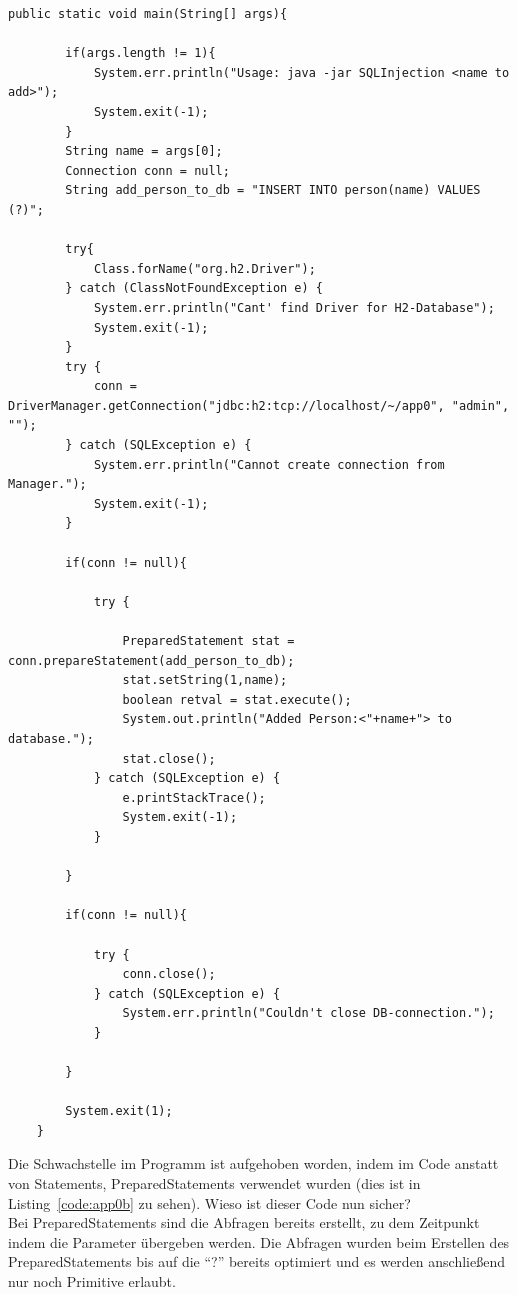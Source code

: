 \documentclass[12pt,a4paper,titlepage,oneside]{scrartcl}
\begin{document}
\begin{lstlisting}[caption=korregierter Code,label=code:app0b,style=c]
public static void main(String[] args){

        if(args.length != 1){
            System.err.println("Usage: java -jar SQLInjection <name to add>");
            System.exit(-1);
        }
        String name = args[0];
        Connection conn = null;
        String add_person_to_db = "INSERT INTO person(name) VALUES (?)";

        try{
            Class.forName("org.h2.Driver");
        } catch (ClassNotFoundException e) {
            System.err.println("Cant' find Driver for H2-Database");
            System.exit(-1);
        }
        try {
            conn = DriverManager.getConnection("jdbc:h2:tcp://localhost/~/app0", "admin", "");
        } catch (SQLException e) {
            System.err.println("Cannot create connection from Manager.");
            System.exit(-1);
        }

        if(conn != null){

            try {

                PreparedStatement stat = conn.prepareStatement(add_person_to_db);
                stat.setString(1,name);
                boolean retval = stat.execute();
                System.out.println("Added Person:<"+name+"> to database.");
                stat.close();
            } catch (SQLException e) {
                e.printStackTrace();
                System.exit(-1);
            }

        }

        if(conn != null){

            try {
                conn.close();
            } catch (SQLException e) {
                System.err.println("Couldn't close DB-connection.");
            }

        }

        System.exit(1);
    }
\end{lstlisting}

Die Schwachstelle im Programm ist aufgehoben worden, indem im Code anstatt von Statements, PreparedStatements verwendet wurden (dies ist in Listing~\ref*{code:app0b} zu sehen). Wieso ist dieser Code nun sicher? \\
Bei PreparedStatements sind die Abfragen bereits erstellt, zu dem Zeitpunkt indem die Parameter übergeben werden. Die Abfragen wurden beim Erstellen des PreparedStatements bis auf die "`?"' bereits optimiert und es werden anschließend nur noch Primitive erlaubt.
\end{document}
